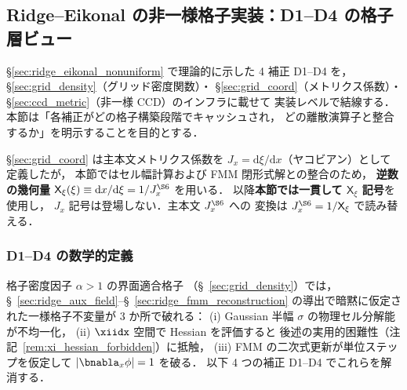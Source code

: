 %
%
\subsection{Ridge--Eikonal の非一様格子実装：D1--D4 の格子層ビュー}
\label{sec:ridge_eikonal_nu_grid}

\S\ref{sec:ridge_eikonal_nonuniform} で理論的に示した
4 補正 D1--D4 を，
\S\ref{sec:grid_density}（グリッド密度関数）・
\S\ref{sec:grid_coord}（メトリクス係数）・
\S\ref{sec:ccd_metric}（非一様 CCD）のインフラに載せて
実装レベルで結線する．
本節は「各補正がどの格子構築段階でキャッシュされ，
どの離散演算子と整合するか」を明示することを目的とする．

\begin{remark}[本節の記号規約]
\label{rem:ridge_nu_jx_convention}
\S\ref{sec:grid_coord} は主本文メトリクス係数を
$J_x = \mathrm{d}\xi/\mathrm{d}x$（ヤコビアン）として定義したが，
本節ではセル幅計算および FMM 閉形式解との整合のため，
\textbf{逆数の幾何量}
$\mathsf{X}_\xi(\xi) \equiv \mathrm{d}x/\mathrm{d}\xi = 1/J_x^{\S6}$ を用いる．
以降\textbf{本節では一貫して $\mathsf{X}_\xi$ 記号}を使用し，
$J_x$ 記号は登場しない．主本文 $J_x^{\S6}$ への
変換は $J_x^{\S6} = 1/\mathsf{X}_\xi$ で読み替える．
\end{remark}

\subsubsection{D1--D4 の数学的定義}
\label{sec:ridge_nu_d1d4_math}

格子密度因子 $\alpha>1$ の界面適合格子
（§~\ref{sec:grid_density}）では，§~\ref{sec:ridge_aux_field}--§~\ref{sec:ridge_fmm_reconstruction}
の導出で暗黙に仮定された一様格子不変量が 3 か所で破れる：
(i) Gaussian 半幅 $\sigma$ の物理セル分解能が不均一化，
(ii) $\xiidx$ 空間で Hessian を評価すると
後述の実用的困難性（注記~\ref{rem:xi_hessian_forbidden}）に抵触，
(iii) FMM の二次式更新が単位ステップを仮定して $|\bnabla_x\phi|=1$ を破る．
以下 4 つの補正 D1--D4 でこれらを解消する．

